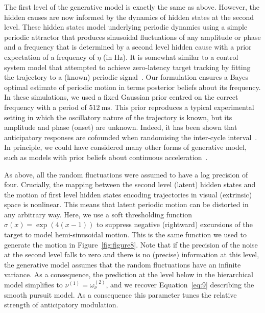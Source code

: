 \documentclass[a4paper]{article} %
\newcommand{\Hz}{\si{\hertz}}%
\newcommand{\ms}{\si{\milli\second}}%
\begin{document}
The first level of the generative model is exactly the same as above.
However, the hidden causes are now informed by the dynamics of hidden
states at the second level. These hidden states model underlying
periodic dynamics using a simple periodic attractor that produces
sinusoidal fluctuations of any amplitude or phase and a frequency that
is determined by a second level hidden cause with a prior expectation of a frequency of
$\eta$ (in \Hz).
It is somewhat similar to a control system model that attempted to
achieve zero-latency target tracking by fitting the trajectory to a
(known) periodic signal~\citep{Bahill83}. Our formulation
ensures a Bayes optimal estimate of periodic motion in terms posterior
beliefs about its frequency. In these simulations, we used a fixed Gaussian prior centred on the correct frequency with a period of $512~\ms$. This prior reproduces a typical experimental
setting in which the oscillatory nature of the trajectory is known, but
its amplitude and phase (onset) are unknown. Indeed, it has been shown
that anticipatory responses are cofounded when randomising the
inter-cycle interval~\citep{Becker85}. In principle, we could
have considered many other forms of generative model, such as models
with prior beliefs about continuous acceleration~\citep{Bennett10}.

As above, all the random fluctuations were assumed to have a log
precision of four. Crucially, the mapping between the second level
(latent) hidden states and the motion of first level hidden states
encoding trajectories in visual (extrinsic) space is nonlinear. This
means that latent periodic motion can be distorted in any arbitrary way.
Here, we use a soft thresholding function
$\sigma(x) = \exp(4(x-1))$
to suppress negative (rightward) excursions of the target to model
hemi-sinusoidal motion. This is the same function we used to generate
the motion in Figure~\ref{fig:figure8}. 
Note that if the precision of the noise at the second level falls to zero and there is no (precise) information at this level, the generative model assumes that the random fluctuations have an infinite variance. As a consequence, the prediction at the level below in the hierarchical model simplifies to $\nu^{(1)} = \omega^{(2)}_\nu $, and we recover Equation~\ref{eq:9} describing the smooth pursuit model. %
As a consequence this parameter tunes the relative strength of anticipatory modulation.
\end{document}
